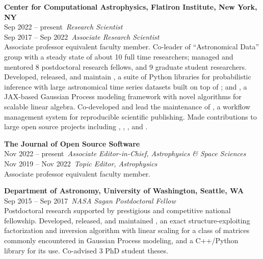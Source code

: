 \documentclass[11pt,letterpaper]{article}
\begin{document}
\begin{list}{}{\cvlist}
    \item
        \textbf{Center for Computational Astrophysics, Flatiron Institute, New
        York, NY} \\
        {\color{numcolor} Sep 2022 -- present}\,
        \emph{Research Scientist} \\
        {\color{numcolor} Sep 2017 -- Sep 2022}\,
        \emph{Associate Research Scientist} \\
        Associate professor equivalent faculty member. 
        Co-leader of ``Astronomical Data'' group with a steady state of about 10 full time researchers; managed and mentored 8 postdoctoral research fellows, and 9 graduate student researchers.
        Developed, released, and maintain \href{https://github.com/exoplanet-dev}{}, a suite of Python libraries for probabilistic inference with large astronomical time series datasets built on top of ; and \href{https://github.com/dfm/tinygp}{}, a JAX-based Gaussian Process modeling framework with novel algorithms for scalable linear algebra.
        Co-developed and lead the maintenance of \href{https://github.com/showyourwork/showyourwork}{}, a workflow management system for reproducible scientific publishing.
        Made contributions to large open source projects including , , , and . 
        \\[1.5ex]

    \item
        \textbf{The Journal of Open Source Software} \\
        {\color{numcolor} Nov 2022 -- present}\,
        \emph{Associate Editor-in-Chief, Astrophysics \& Space Sciences} \\
        {\color{numcolor} Nov 2019 -- Nov 2022}\,
        \emph{Topic Editor, Astrophysics} \\
        Associate professor equivalent faculty member. \\[1.5ex]

    \item
        \textbf{Department of Astronomy, University of Washington, Seattle, WA} \\
        {\color{numcolor} Sep 2015 -- Sep 2017}\,
        \emph{NASA Sagan Postdoctoral Fellow} \\
        Postdoctoral research supported by prestigious and competitive national fellowship.
        Developed, released, and maintained \href{https://github.com/dfm/celerite}{}, an exact structure-exploiting factorization and inversion algorithm with linear scaling for a class of matrices commonly encountered in Gaussian Process modeling, and a C++/Python library for its use.
        Co-advised 3 PhD student theses.
        \\[1.5ex]


\end{list}
\end{document}
